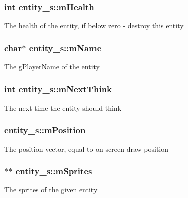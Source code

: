 \subsubsection[{\texorpdfstring{m\+Health}{mHealth}}]{\setlength{\rightskip}{0pt plus 5cm}int entity\+\_\+s\+::m\+Health}\hypertarget{structentity__s_a4526f4ec298fe048fb0394eb1eada6c2}{}\label{structentity__s_a4526f4ec298fe048fb0394eb1eada6c2}
The health of the entity, if below zero -\/ destroy this entity 
\subsubsection[{\texorpdfstring{m\+Name}{mName}}]{\setlength{\rightskip}{0pt plus 5cm}char$\ast$ entity\+\_\+s\+::m\+Name}\hypertarget{structentity__s_ac7d10f054f8dbe1f379535aabb904e73}{}\label{structentity__s_ac7d10f054f8dbe1f379535aabb904e73}
The g\+Player\+Name of the entity 
\subsubsection[{\texorpdfstring{m\+Next\+Think}{mNextThink}}]{\setlength{\rightskip}{0pt plus 5cm}int entity\+\_\+s\+::m\+Next\+Think}\hypertarget{structentity__s_a760363fc97f98abe86919af5e1957745}{}\label{structentity__s_a760363fc97f98abe86919af5e1957745}
The next time the entity should think 
\subsubsection[{\texorpdfstring{m\+Position}{mPosition}}]{ entity\+\_\+s\+::m\+Position}\hypertarget{structentity__s_a41a58e7265c9e8738dcf248d04996fde}{}\label{structentity__s_a41a58e7265c9e8738dcf248d04996fde}
The position vector, equal to on screen draw position 
\subsubsection[{\texorpdfstring{m\+Sprites}{mSprites}}]{$\ast$$\ast$ entity\+\_\+s\+::m\+Sprites}\hypertarget{structentity__s_a559fa151dfaeab03a371853042d4b22f}{}\label{structentity__s_a559fa151dfaeab03a371853042d4b22f}
The sprites of the given entity 
